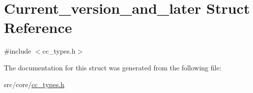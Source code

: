 \hypertarget{a00097}{\section{Current\-\_\-version\-\_\-and\-\_\-later Struct Reference}
\label{a00097}
}


{\ttfamily \#include $<$cc\-\_\-types.\-h$>$}



The documentation for this struct was generated from the following file\-:\begin{DoxyCompactItemize}
\item 
src/core/\hyperlink{a00216}{cc\-\_\-types.\-h}\end{DoxyCompactItemize}
